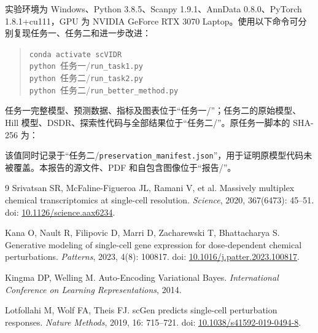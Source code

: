 \documentclass[UTF8,11pt,a4paper,fontset=fandol]{ctexart}
\newcommand{\dsdr}{\textsc{DSDR}}
\begin{document}
实验环境为 Windows、Python 3.8.5、Scanpy 1.9.1、AnnData 0.8.0、PyTorch 1.8.1+cu111，GPU 为 NVIDIA GeForce RTX 3070 Laptop。使用以下命令可分别复现任务一、任务二和进一步改进：

\begin{quote}\small
\texttt{conda activate scVIDR}\\
\texttt{python }任务一/\texttt{run\_task1.py}\\
\texttt{python }任务二/\texttt{run\_task2.py}\\
\texttt{python }任务二/\texttt{run\_better\_method.py}
\end{quote}

任务一完整模型、预测数据、指标及图表位于“任务一/”；任务二的原始模型、Hill 模型、\dsdr、探索性代码与全部结果位于“任务二/”。原任务一脚本的 SHA-256 为：
\begin{quote}\footnotesize
\texttt{}
\end{quote}
该值同时记录于“任务二/\texttt{preservation\_manifest.json}”，用于证明原模型代码未被覆盖。本报告的源文件、PDF 和自包含图像位于“报告/”。

\begin{thebibliography}{9}
Srivatsan SR, McFaline-Figueroa JL, Ramani V, et al.
Massively multiplex chemical transcriptomics at single-cell resolution.
\textit{Science}, 2020, 367(6473): 45--51.
doi: \href{https://doi.org/10.1126/science.aax6234}{10.1126/science.aax6234}.

Kana O, Nault R, Filipovic D, Marri D, Zacharewski T, Bhattacharya S.
Generative modeling of single-cell gene expression for dose-dependent chemical perturbations.
\textit{Patterns}, 2023, 4(8): 100817.
doi: \href{https://doi.org/10.1016/j.patter.2023.100817}{10.1016/j.patter.2023.100817}.

Kingma DP, Welling M.
Auto-Encoding Variational Bayes.
\textit{International Conference on Learning Representations}, 2014.

Lotfollahi M, Wolf FA, Theis FJ.
scGen predicts single-cell perturbation responses.
\textit{Nature Methods}, 2019, 16: 715--721.
doi: \href{https://doi.org/10.1038/s41592-019-0494-8}{10.1038/s41592-019-0494-8}.
\end{thebibliography}
\end{document}
